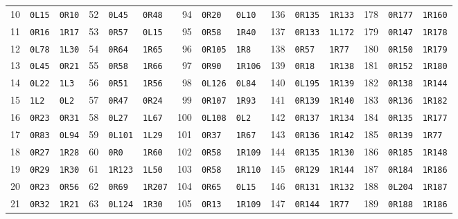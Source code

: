 \begin{center}
\begin{tabular}{rll@{\qquad}rll@{\qquad}rll@{\qquad}rll@{\qquad}rll}
10 & \texttt{0L15} & \texttt{0R10} & 52 & \texttt{0L45} & \texttt{0R48} & 94 & \texttt{0R20} & \texttt{0L10} & 136 & \texttt{0R135} & \texttt{1R133} & 178 & \texttt{0R177} & \texttt{1R160} \\
11 & \texttt{0R16} & \texttt{1R17} & 53 & \texttt{0R57} & \texttt{0L15} & 95 & \texttt{0R58} & \texttt{1R40} & 137 & \texttt{0R133} & \texttt{1L172} & 179 & \texttt{0R147} & \texttt{1R178} \\
12 & \texttt{0L78} & \texttt{1L30} & 54 & \texttt{0R64} & \texttt{1R65} & 96 & \texttt{0R105} & \texttt{1R8} & 138 & \texttt{0R57} & \texttt{1R77} & 180 & \texttt{0R150} & \texttt{1R179} \\
13 & \texttt{0L45} & \texttt{0R21} & 55 & \texttt{0R58} & \texttt{1R66} & 97 & \texttt{0R90} & \texttt{1R106} & 139 & \texttt{0R18} & \texttt{1R138} & 181 & \texttt{0R152} & \texttt{1R180} \\
14 & \texttt{0L22} & \texttt{1L3} & 56 & \texttt{0R51} & \texttt{1R56} & 98 & \texttt{0L126} & \texttt{0L84} & 140 & \texttt{0L195} & \texttt{1R139} & 182 & \texttt{0R138} & \texttt{1R144} \\
15 & \texttt{1L2} & \texttt{0L2} & 57 & \texttt{0R47} & \texttt{0R24} & 99 & \texttt{0R107} & \texttt{1R93} & 141 & \texttt{0R139} & \texttt{1R140} & 183 & \texttt{0R136} & \texttt{1R182} \\
16 & \texttt{0R23} & \texttt{0R31} & 58 & \texttt{0L27} & \texttt{1L67} & 100 & \texttt{0L108} & \texttt{0L2} & 142 & \texttt{0R137} & \texttt{1R134} & 184 & \texttt{0R135} & \texttt{1R177} \\
17 & \texttt{0R83} & \texttt{0L94} & 59 & \texttt{0L101} & \texttt{1L29} & 101 & \texttt{0R37} & \texttt{1R67} & 143 & \texttt{0R136} & \texttt{1R142} & 185 & \texttt{0R139} & \texttt{1R77} \\
18 & \texttt{0R27} & \texttt{1R28} & 60 & \texttt{0R0} & \texttt{1R60} & 102 & \texttt{0R58} & \texttt{1R109} & 144 & \texttt{0R135} & \texttt{1R130} & 186 & \texttt{0R185} & \texttt{1R148} \\
19 & \texttt{0R29} & \texttt{1R30} & 61 & \texttt{1R123} & \texttt{1L50} & 103 & \texttt{0R58} & \texttt{1R110} & 145 & \texttt{0R129} & \texttt{1R144} & 187 & \texttt{0R184} & \texttt{1R186} \\
20 & \texttt{0R23} & \texttt{0R56} & 62 & \texttt{0R69} & \texttt{1R207} & 104 & \texttt{0R65} & \texttt{0L15} & 146 & \texttt{0R131} & \texttt{1R132} & 188 & \texttt{0L204} & \texttt{1R187} \\
21 & \texttt{0R32} & \texttt{1R21} & 63 & \texttt{0L124} & \texttt{1R30} & 105 & \texttt{0R13} & \texttt{1R109} & 147 & \texttt{0R144} & \texttt{1R77} & 189 & \texttt{0R188} & \texttt{1R186} \\

\end{tabular}
\end{center}
